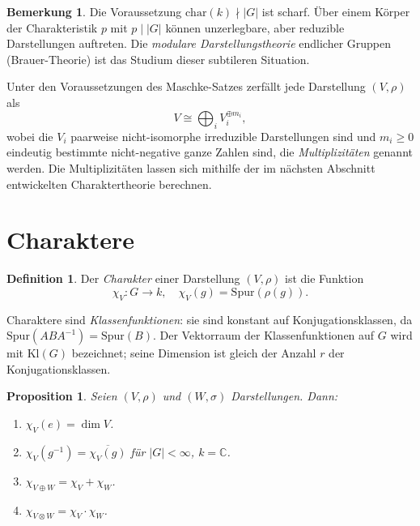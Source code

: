 \documentclass[12pt,a4paper]{amsart}
\newtheorem{proposition}[theorem]{Proposition}
\theoremstyle{definition}
\newtheorem{definition}[theorem]{Definition}
\newtheorem{bemerkung}[theorem]{Bemerkung}
\begin{document}
\begin{bemerkung}
Die Voraussetzung $\mathrm{char}(k) \nmid |G|$ ist scharf.  Über einem Körper der
Charakteristik $p$ mit $p \mid |G|$ können unzerlegbare, aber reduzible
Darstellungen auftreten.  Die \emph{modulare Darstellungstheorie} endlicher
Gruppen (Brauer-Theorie) ist das Studium dieser subtileren Situation.
\end{bemerkung}

Unter den Voraussetzungen des Maschke-Satzes zerfällt jede Darstellung $(V,\rho)$
als
\[
    V \cong \bigoplus_{i} V_i^{\oplus m_i},
\]
wobei die $V_i$ paarweise nicht-isomorphe irreduzible Darstellungen sind und
$m_i \geq 0$ eindeutig bestimmte nicht-negative ganze Zahlen sind, die
\emph{Multiplizitäten} genannt werden.  Die Multiplizitäten lassen sich mithilfe
der im nächsten Abschnitt entwickelten Charaktertheorie berechnen.

\section{Charaktere}
\label{sec:charaktere}

\begin{definition}
Der \emph{Charakter} einer Darstellung $(V,\rho)$ ist die Funktion
\[
    \chi_V \colon G \longrightarrow k, \quad \chi_V(g) = \mathrm{Spur}(\rho(g)).
\]
\end{definition}

Charaktere sind \emph{Klassenfunktionen}: sie sind konstant auf Konjugationsklassen,
da $\mathrm{Spur}(ABA^{-1}) = \mathrm{Spur}(B)$.  Der Vektorraum der
Klassenfunktionen auf $G$ wird mit $\mathrm{Kl}(G)$ bezeichnet; seine Dimension
ist gleich der Anzahl $r$ der Konjugationsklassen.

\begin{proposition}
\label{prop:char}
Seien $(V,\rho)$ und $(W,\sigma)$ Darstellungen.  Dann:
\begin{enumerate}[label=\textup{(\roman*)}]
  \item $\chi_V(e) = \dim V$.
  \item $\chi_V(g^{-1}) = \overline{\chi_V(g)}$ für $|G| < \infty$, $k = \mathbb{C}$.
  \item $\chi_{V \oplus W} = \chi_V + \chi_W$.
  \item $\chi_{V \otimes W} = \chi_V \cdot \chi_W$.
\end{enumerate}
\end{proposition}
\end{document}
